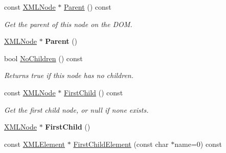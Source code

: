\begin{DoxyCompactItemize}
\mbox{\label{classtinyxml2_1_1XMLNode_ae0f62bc186c56c2e0483ebd52dbfbe34}} 
const \mbox{\hyperlink{classtinyxml2_1_1XMLNode}{X\+M\+L\+Node}} $\ast$ \mbox{\hyperlink{classtinyxml2_1_1XMLNode_ae0f62bc186c56c2e0483ebd52dbfbe34}{Parent}} () const
\begin{DoxyCompactList}\small\item\em Get the parent of this node on the D\+OM. \end{DoxyCompactList}\item 
\mbox{\label{classtinyxml2_1_1XMLNode_a76029693a5a54fbb721a41d7a0ca8a97}} 
\mbox{\hyperlink{classtinyxml2_1_1XMLNode}{X\+M\+L\+Node}} $\ast$ {\bfseries Parent} ()
\item 
\mbox{\label{classtinyxml2_1_1XMLNode_ac3ab489e6e202a3cd1762d3b332e89d4}} 
bool \mbox{\hyperlink{classtinyxml2_1_1XMLNode_ac3ab489e6e202a3cd1762d3b332e89d4}{No\+Children}} () const
\begin{DoxyCompactList}\small\item\em Returns true if this node has no children. \end{DoxyCompactList}\item 
\mbox{\label{classtinyxml2_1_1XMLNode_ae7dc225e1018cdd685f7563593a1fe08}} 
const \mbox{\hyperlink{classtinyxml2_1_1XMLNode}{X\+M\+L\+Node}} $\ast$ \mbox{\hyperlink{classtinyxml2_1_1XMLNode_ae7dc225e1018cdd685f7563593a1fe08}{First\+Child}} () const
\begin{DoxyCompactList}\small\item\em Get the first child node, or null if none exists. \end{DoxyCompactList}\item 
\mbox{\label{classtinyxml2_1_1XMLNode_a2d6c70c475146b48bc93a7fafdeff5e0}} 
\mbox{\hyperlink{classtinyxml2_1_1XMLNode}{X\+M\+L\+Node}} $\ast$ {\bfseries First\+Child} ()
\item 
const \mbox{\hyperlink{classtinyxml2_1_1XMLElement}{X\+M\+L\+Element}} $\ast$ \mbox{\hyperlink{classtinyxml2_1_1XMLNode_a1795a35852dc8aae877cc8ded986e59b}{First\+Child\+Element}} (const char $\ast$name=0) const
\item 
\mbox{\label{classtinyxml2_1_1XMLNode_af1e0e475cc27d5e7eeaf4d732691b741}} 

\end{DoxyCompactItemize}
